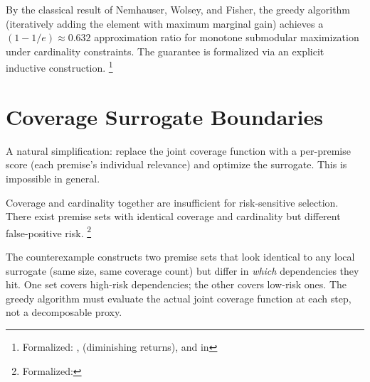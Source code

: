 \documentclass[11pt,openany]{report}
\begin{document}
\noindent
By the classical result of Nemhauser, Wolsey, and Fisher, the greedy
algorithm (iteratively adding the element with maximum marginal gain)
achieves a $(1 - 1/e) \approx 0.632$ approximation ratio for monotone
submodular maximization under cardinality constraints.  The guarantee
is formalized via an explicit  inductive
construction.%
\footnote{Formalized:
,
 (diminishing returns),
and  in
}



\section{Coverage Surrogate Boundaries}
\label{sec:surrogate-nogo}

A natural simplification: replace the joint coverage function with
a per-premise score (each premise's individual relevance) and optimize
the surrogate.  This is impossible in general.

\boundarystart
\begin{theorem}
\label{thm:surrogate-no-go}
Coverage and cardinality together are insufficient for risk-sensitive
selection.  There exist premise sets with identical coverage and
cardinality but different false-positive risk.%
\footnote{Formalized:
}
\end{theorem}
\boundaryend

\noindent
The counterexample constructs two premise sets that look identical to
any local surrogate (same size, same coverage count) but differ in
\emph{which} dependencies they hit.  One set covers high-risk
dependencies; the other covers low-risk ones.  The greedy algorithm
must evaluate the actual joint coverage function at each step, not a
decomposable proxy.
\end{document}
